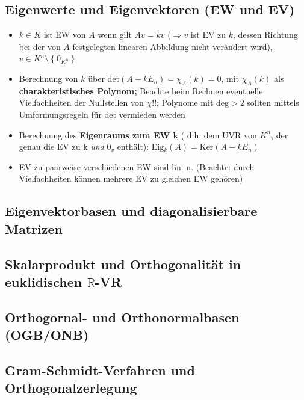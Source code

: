 \documentclass[10pt,a4paper]{article}
\begin{document}
\subsection{Eigenwerte und Eigenvektoren (EW und EV)}
\begin{itemize}
\item $k\in K$ ist EW von $A$ wenn gilt $Av=kv$ ($\Rightarrow v$ ist EV zu $k$, dessen Richtung bei der von $A$ festgelegten linearen Abbildung nicht verändert wird), $v\in K^{n}\setminus \left\lbrace 0_{K^{n}}\right\rbrace$
\item Berechnung von $k$ über det$(A-kE_{n})=\chi_{A}(k)=0$, mit $\chi_{A}(k)$ als \textbf{charakteristisches Polynom;} Beachte beim Rechnen eventuelle Vielfachheiten der Nullstellen von $\chi$!!; Polynome mit deg$>2$ sollten mittels  Umformungsregeln für det vermieden werden
\item Berechnung des \textbf{Eigenraums zum EW $\boldsymbol{k}$} ( d.h. dem UVR von $K^{n}$, der genau die EV zu k \textit{und} $0_{v}$ enthält): Eig$_{k}(A)=\text{Ker}(A-kE_{n})$
\item EV zu paarweise verschiedenen EW sind lin. u. (Beachte: durch Vielfachheiten können mehrere EV zu gleichen EW gehören)
\end{itemize}



\subsection{Eigenvektorbasen und diagonalisierbare Matrizen}


\subsection{Skalarprodukt und Orthogonalität in euklidischen $\mathbb{R}$-VR}

\subsection{Orthogornal- und Orthonormalbasen (OGB/ONB) }

\subsection{Gram-Schmidt-Verfahren und Orthogonalzerlegung}
\end{document}
